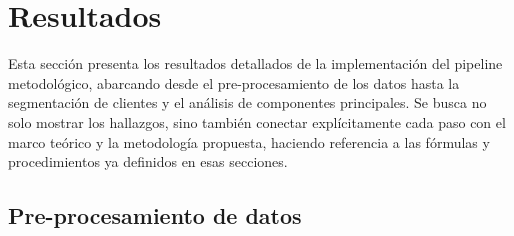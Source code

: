 \section{Resultados}
\label{sec:resultados}

Esta sección presenta los resultados detallados de la implementación del pipeline metodológico, abarcando desde el pre-procesamiento de los datos hasta la segmentación de clientes y el análisis de componentes principales. Se busca no solo mostrar los hallazgos, sino también conectar explícitamente cada paso con el marco teórico y la metodología propuesta, haciendo referencia a las fórmulas y procedimientos ya definidos en esas secciones.

\subsection{Pre-procesamiento de datos}

